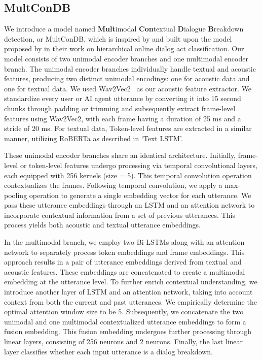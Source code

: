 \subsection{MultConDB}
We introduce a model named \textbf{Mult}imodal \textbf{Con}textual \textbf{D}ialogue \textbf{B}reakdown detection, or MultConDB, which is inspired by and built upon the model proposed by \cite{miah-etal-2023-hierarchical} in their work on hierarchical online dialog act classification. Our model consists of two unimodal encoder branches and one multimodal encoder branch. The unimodal encoder branches individually handle textual and acoustic features, producing two distinct unimodal encodings: one for acoustic data and one for textual data. We used Wav2Vec2~\cite{10.5555/3495724.3496768} as our acoustic feature extractor. We standardize every user or AI agent utterance by converting it into 15 second chunks through padding or trimming and subsequently extract frame-level features using Wav2Vec2, with each frame having a duration of 25 ms and a stride of 20 ms. For textual data, Token-level features are extracted in a similar manner, utilizing RoBERTa as described in `Text LSTM'.

These unimodal encoder branches share an identical architecture. Initially, frame-level or token-level features undergo processing via temporal convolutional layers, each equipped with 256 kernels (size = 5). This temporal convolution operation contextualizes the frames. Following temporal convolution, we apply a max-pooling operation to generate a single embedding vector for each utterance. We pass these utterance embeddings through an LSTM and an attention network to incorporate contextual information from a set of previous utterances. This process yields both acoustic and textual utterance embeddings.

In the multimodal branch, we employ two Bi-LSTMs along with an attention network to separately process token embeddings and frame embeddings. This approach results in a pair of utterance embeddings derived from textual and acoustic features. These embeddings are concatenated to create a multimodal embedding at the utterance level. To further enrich contextual understanding, we introduce another layer of LSTM and an attention network, taking into account context from both the current and past utterances. We empirically determine the optimal attention window size to be 5. Subsequently, we concatenate the two unimodal and one multimodal contextualized utterance embeddings to form a fusion embedding. This fusion embedding undergoes further processing through linear layers, consisting of 256 neurons and 2 neurons. Finally, the last linear layer classifies whether each input utterance is a dialog breakdown.


